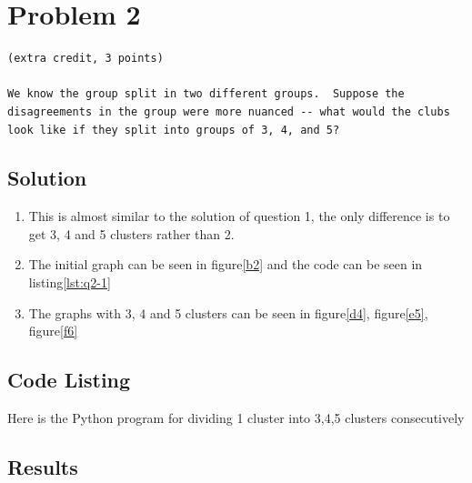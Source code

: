 \section{Problem 2}
\label{part2}
\begin{verbatim}
(extra credit, 3 points)

We know the group split in two different groups.  Suppose the
disagreements in the group were more nuanced -- what would the clubs
look like if they split into groups of 3, 4, and 5?

\end{verbatim}

\subsection{Solution}
\begin{enumerate}
\item This is almost similar to the solution of question 1, the only difference is to get 3, 4 and 5 clusters rather than 2.
\item The initial graph can be seen in figure\ref{b2} and the code can be seen in listing\ref{lst:q2-1}
\item The graphs with 3, 4 and 5 clusters can be seen in figure\ref{d4}, figure\ref{e5}, figure\ref{f6}
\end{enumerate}
\newpage
\subsection{Code Listing}
Here is the Python program for dividing 1 cluster into 3,4,5 clusters consecutively


\newpage
\subsection{Results}

